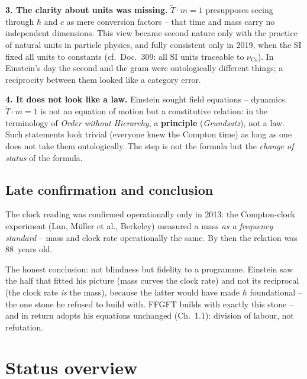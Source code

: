 \documentclass[11pt]{report}
\begin{document}
\textbf{3. The clarity about units was missing.}
$\tilde T \cdot m = 1$ presupposes seeing through $\hbar$ and $c$
as mere conversion factors -- that time and mass carry no
independent dimensions. This view became second nature only with
the practice of natural units in particle physics, and fully
consistent only in 2019, when the SI fixed all units to constants
(cf.\ Doc.~309: all SI units traceable to $\nu_\text{Cs}$). In
Einstein's day the second and the gram were ontologically different
things; a reciprocity between them looked like a category error.

\textbf{4. It does not look like a law.} Einstein sought field
equations -- dynamics. $\tilde T \cdot m = 1$ is not an equation of
motion but a constitutive relation: in the terminology of
\emph{Order without Hierarchy}, a \textbf{principle}
(\emph{Grundsatz}), not a law. Such statements look trivial
(everyone knew the Compton time) as long as one does not take them
ontologically. The step is not the formula but the \emph{change of
status} of the formula.

\section{Late confirmation and conclusion}

The clock reading was confirmed operationally only in 2013: the
Compton-clock experiment (Lan, Müller et al., Berkeley) measured a
mass \emph{as a frequency standard} -- mass and clock rate
operationally the same. By then the relation was 88~years old.

The honest conclusion: not blindness but fidelity to a programme.
Einstein saw the half that fitted his picture (mass curves the
clock rate) and not its reciprocal (the clock rate \emph{is} the
mass), because the latter would have made $\hbar$ foundational --
the one stone he refused to build with. FFGFT builds with exactly
this stone -- and in return adopts his equations unchanged
(Ch.~1.1): division of labour, not refutation.

\chapter{Status overview}
\end{document}
